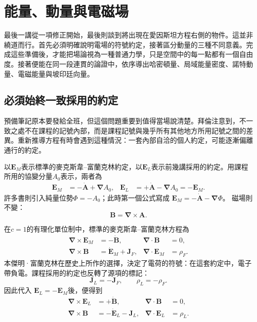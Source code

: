 \chapter{能量、動量與電磁場}

最後一講從一項修正開始，最後則談到將出現在愛因斯坦方程右側的物件。這並非繞道而行。首先必須明確說明電場的符號約定，接著區分動量的三種不同意義。完成這些準備後，才能把場論視為一種普通力學，只是空間中的每一點都有一個自由度。接著便能在同一段連貫的論證中，依序導出哈密頓量、局域能量密度、諾特動量、電磁能量與坡印廷向量。

\section{必須始終一致採用的約定}

預備筆記原本要發給全班，但這個問題重要到值得當場說清楚。拜倫注意到，不一致之處不在課程的記號內部，而是課程記號與幾乎所有其他地方所用記號之間的差異。重新推導方程有時會遇到這種情況：一套內部自洽的個人約定，可能逐漸偏離通行的約定。

以\(\mathbf E_M\)表示標準的麥克斯韋--富蘭克林約定，以\(\mathbf E_L\)表示前幾講採用的約定。用課程所用的協變分量\(A_0\)表示，兩者為
\begin{align}
\mathbf E_M
  &= -\dot{\mathbf A}+\boldsymbol{\nabla}A_0,
&
\mathbf E_L
  &= +\dot{\mathbf A}-\boldsymbol{\nabla}A_0
   =-\mathbf E_M .
\label{eq:two-electric-conventions}
\end{align}
許多書則引入純量位勢\(\Phi=-A_0\)；此時第一個公式寫成
\(\mathbf E_M=-\dot{\mathbf A}-\boldsymbol{\nabla}\Phi\)。
磁場則不變：
\begin{equation}
\mathbf B=\boldsymbol{\nabla}\times\mathbf A.
\label{eq:B-from-A-opening}
\end{equation}

在\(c=1\)的有理化單位制中，標準的麥克斯韋--富蘭克林方程為
\begin{align}
\boldsymbol{\nabla}\times\mathbf E_M&=-\dot{\mathbf B},
&
\boldsymbol{\nabla}\cdot\mathbf B&=0,
\nonumber\\
\boldsymbol{\nabla}\times\mathbf B&=\dot{\mathbf E}_M+\mathbf J_F,
&
\boldsymbol{\nabla}\cdot\mathbf E_M&=\rho_F .
\label{eq:maxwell-franklin}
\end{align}
本傑明·富蘭克林在歷史上所作的選擇，決定了電荷的符號：在這套約定中，電子帶負電。課程採用的約定也反轉了源項的標記：
\begin{equation}
\mathbf J_L=-\mathbf J_F,
\qquad
\rho_L=-\rho_F.
\label{eq:source-convention-map}
\end{equation}
因此代入
\(\mathbf E_L=-\mathbf E_M\)後，便得到
\begin{align}
\boldsymbol{\nabla}\times\mathbf E_L&=+\dot{\mathbf B},
&
\boldsymbol{\nabla}\cdot\mathbf B&=0,
\nonumber\\
\boldsymbol{\nabla}\times\mathbf B&=-\dot{\mathbf E}_L-\mathbf J_L,
&
\boldsymbol{\nabla}\cdot\mathbf E_L&=\rho_L .
\label{eq:maxwell-course-convention}
\end{align}

